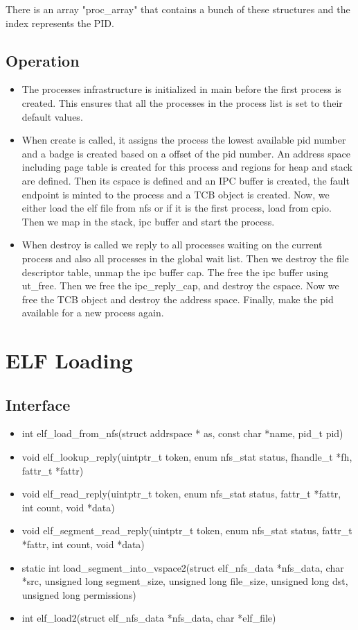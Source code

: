 \documentclass[12pt]{article}
\begin{document}
There is an array "proc\_array" that contains a bunch of these structures and the index represents the PID.
\subsection{Operation}
\begin{itemize}
\item The processes infrastructure is initialized in main before the first process is created. This ensures that all the processes in the process list is set to their default values. 

\item When create is called, it assigns the process the lowest available pid number and a badge is created based on a offset of the pid number. An address space including page table is created for this process and regions for heap and stack are defined. Then its cspace is defined and an IPC buffer is created, the fault endpoint is minted to the process and a TCB object is created. Now, we either load the elf file from nfs or if it is the first process, load from cpio. Then we map in the stack, ipc buffer and start the process.

\item When destroy is called we reply to all processes waiting on the current process and also all processes in the global wait list. Then we destroy the file descriptor table, unmap the ipc buffer cap. The free the ipc buffer using ut\_free. Then we free the ipc\_reply\_cap, and destroy the cspace. Now we free the TCB object and destroy the address space. Finally, make the pid available for a new process again.
\end{itemize}
\clearpage
\section{ELF Loading}
\subsection{Interface}
\begin{itemize}
\item int elf\_load\_from\_nfs(struct addrspace * as, const char *name, pid\_t pid)
\item void elf\_lookup\_reply(uintptr\_t token, enum nfs\_stat status, fhandle\_t *fh, fattr\_t *fattr)
\item void elf\_read\_reply(uintptr\_t token, enum nfs\_stat status, fattr\_t *fattr, int count, void *data)
\item void elf\_segment\_read\_reply(uintptr\_t token, enum nfs\_stat status, fattr\_t *fattr, int count, void *data)
\item static int load\_segment\_into\_vspace2(struct elf\_nfs\_data *nfs\_data, char *src, unsigned long segment\_size, unsigned long file\_size, unsigned long dst, unsigned long permissions)
\item int elf\_load2(struct elf\_nfs\_data *nfs\_data, char *elf\_file)
\end{itemize}
\end{document}
